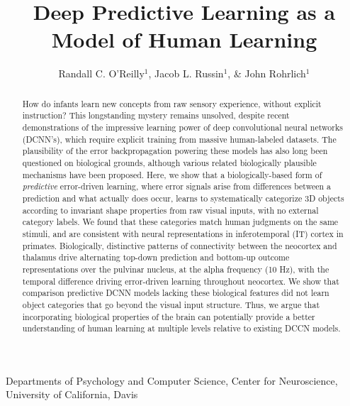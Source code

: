 \documentclass[12pt,twoside]{naturefigs}  %
\title{ Deep Predictive Learning as a Model of Human Learning }
\author{Randall C. O'Reilly$^{1}$, Jacob L. Russin$^1$, \& John Rohrlich$^1$}
\newif\myifpdf
\begin{document}
\sloppy
\raggedbottom
{}

\maketitle 

\begin{affiliations}
  \item Departments of Psychology and Computer Science, Center for Neuroscience, 
  University of California, Davis
\end{affiliations}

\pagestyle{myheadings}

\begin{abstract}
How do infants learn new concepts from raw sensory experience, without explicit instruction?  This longstanding mystery remains unsolved, despite recent demonstrations of the impressive learning power of deep convolutional neural networks (DCNN's), which require explicit training from massive human-labeled datasets\cite{KrizhevskySutskeverHinton12,LeCunBengioHinton15,Schmidhuber15a}.  The plausibility of the error backpropagation\cite{RumelhartHintonWilliams86} powering these models has also long been questioned on biological grounds\cite{Crick89}, although various related biologically plausible mechanisms have been proposed\cite{OReilly96,XieSeung03,BengioMesnardFischerEtAl17}.  Here, we show that a biologically-based form of {\em predictive} error-driven learning, where error signals arise from differences between a prediction and what actually does occur\cite{Elman90,ElmanBatesKarmiloff-SmithEtAl96}, learns to systematically categorize 3D objects according to invariant shape properties from raw visual inputs, with no external category labels.  We found that these categories match human judgments on the same stimuli, and are consistent with neural representations in inferotemporal (IT) cortex in primates\cite{CadieuHongYaminsEtAl14}.  Biologically, distinctive patterns of connectivity between the neocortex and thalamus\cite{ShermanGuillery06} drive alternating top-down prediction and bottom-up outcome representations over the pulvinar nucleus, at the alpha frequency (10 Hz), with the temporal difference driving error-driven learning throughout neocortex.  We show that comparison predictive DCNN models lacking these biological features\cite{LotterKreimanCox16} did not learn object categories that go beyond the visual input structure.  Thus, we argue that incorporating biological properties of the brain can potentially provide a better understanding of human learning at multiple levels relative to existing DCCN models.
\end{abstract}
\end{document}
